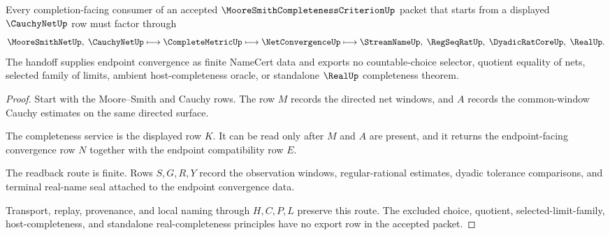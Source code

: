 \begin{theorem}
\label{thm:moore-smith-completeness-criterion-cauchy-net-handoff}
Every completion-facing consumer of an accepted $\MooreSmithCompletenessCriterionUp$ packet that starts from a displayed $\CauchyNetUp$ row must factor through
$$
\MooreSmithNetUp,\;\CauchyNetUp
\longmapsto
\CompleteMetricUp
\longmapsto
\NetConvergenceUp
\longmapsto
\StreamNameUp,\;\RegSeqRatUp,\;\DyadicRatCoreUp,\;\RealUp .
$$
The handoff supplies endpoint convergence as finite NameCert data and exports no countable-choice selector, quotient equality of nets, selected family of limits, ambient host-completeness oracle, or standalone $\RealUp$ completeness theorem.
\end{theorem}
\begin{proof}
Start with the Moore--Smith and Cauchy rows. The row $M$ records the directed net windows, and $A$ records the common-window Cauchy estimates on the same directed surface.

The completeness service is the displayed row $K$. It can be read only after $M$ and $A$ are present, and it returns the endpoint-facing convergence row $N$ together with the endpoint compatibility row $E$.

The readback route is finite. Rows $S,G,R,Y$ record the observation windows, regular-rational estimates, dyadic tolerance comparisons, and terminal real-name seal attached to the endpoint convergence data.

Transport, replay, provenance, and local naming through $H,C,P,L$ preserve this route. The excluded choice, quotient, selected-limit-family, host-completeness, and standalone real-completeness principles have no export row in the accepted packet.
\end{proof}


